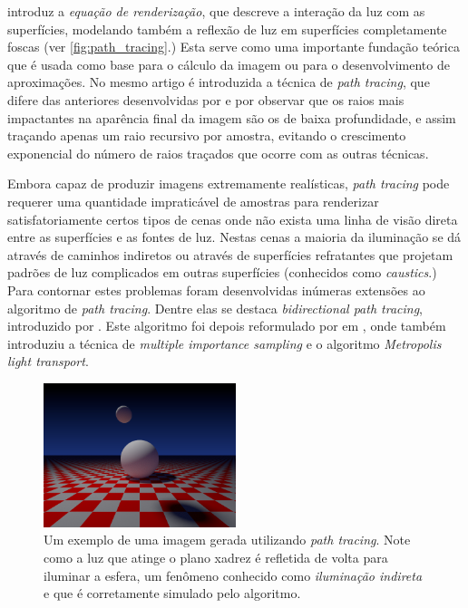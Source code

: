 \documentclass[12pt]{article}
\begin{document}
 introduz a \emph{equação de renderização}, que descreve a interação da luz com as
superfícies, modelando também a reflexão de luz em superfícies completamente foscas (ver
\autoref{fig:path_tracing}.) Esta serve como uma importante fundação teórica que é usada como base
para o cálculo da imagem ou para o desenvolvimento de aproximações. No mesmo artigo é introduzida a
técnica de \emph{path tracing}, que difere das anteriores desenvolvidas por \citeauthor{cook1984} e
\citeauthor{whitted1980} por observar que os raios mais impactantes na aparência final da imagem são
os de baixa profundidade, e assim traçando apenas um raio recursivo por amostra, evitando o
crescimento exponencial do número de raios traçados que ocorre com as outras técnicas.

Embora capaz de produzir imagens extremamente realísticas, \emph{path tracing} pode requerer uma
quantidade impraticável de amostras para renderizar satisfatoriamente certos tipos de cenas onde não
exista uma linha de visão direta entre as superfícies e as fontes de luz. Nestas cenas a maioria da
iluminação se dá através de caminhos indiretos ou através de superfícies refratantes que projetam
padrões de luz complicados em outras superfícies (conhecidos como \emph{caustics}.) Para contornar
estes problemas foram desenvolvidas inúmeras extensões ao algoritmo de \emph{path tracing}. Dentre
elas se destaca \emph{bidirectional path tracing}, introduzido por \citet{lafortune1993}. Este
algoritmo foi depois reformulado por \citeauthor{veach1997} em \citep{veach1997}, onde também
introduziu a técnica de \emph{multiple importance sampling} e o algoritmo \emph{Metropolis light
transport}.

\begin{figure}
	\centering
	\includegraphics[width=0.5\textwidth]{exemplo_imagem}
	\caption{
		Um exemplo de uma imagem gerada utilizando \emph{path tracing}. Note como a luz que atinge o
		plano xadrez é refletida de volta para iluminar a esfera, um fenômeno conhecido como
		\emph{iluminação indireta} e que é corretamente simulado pelo algoritmo.
	}
	\label{fig:path_tracing}
\end{figure}
\end{document}
